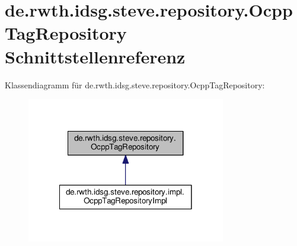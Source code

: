 \hypertarget{interfacede_1_1rwth_1_1idsg_1_1steve_1_1repository_1_1_ocpp_tag_repository}{\section{de.\-rwth.\-idsg.\-steve.\-repository.\-Ocpp\-Tag\-Repository Schnittstellenreferenz}
\label{interfacede_1_1rwth_1_1idsg_1_1steve_1_1repository_1_1_ocpp_tag_repository}
}


Klassendiagramm für de.\-rwth.\-idsg.\-steve.\-repository.\-Ocpp\-Tag\-Repository\-:\nopagebreak
\begin{figure}[H]
\begin{center}
\leavevmode
\includegraphics[width=246pt]{interfacede_1_1rwth_1_1idsg_1_1steve_1_1repository_1_1_ocpp_tag_repository__inherit__graph}
\end{center}
\end{figure}
